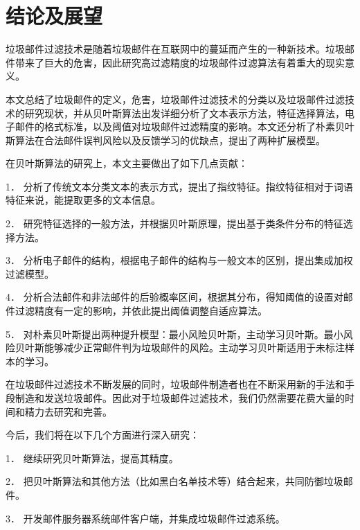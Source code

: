 \chapter{结论及展望}

垃圾邮件过滤技术是随着垃圾邮件在互联网中的蔓延而产生的一种新技术。垃圾邮件带来了巨大的危害，因此研究高过滤精度的垃圾邮件过滤算法有着重大的现实意义。

本文总结了垃圾邮件的定义，危害，垃圾邮件过滤技术的分类以及垃圾邮件过滤技术的研究现状，并从贝叶斯算法出发详细分析了文本表示方法，特征选择算法，电子邮件的格式标准，以及阈值对垃圾邮件过滤精度的影响。本文还分析了朴素贝叶斯算法在合法邮件误判风险以及反馈学习的优缺点，提出了两种扩展模型。

  在贝叶斯算法的研究上，本文主要做出了如下几点贡献：
  
1．	分析了传统文本分类文本的表示方式，提出了指纹特征。指纹特征相对于词语特征来说，能提取更多的文本信息。

2．	研究特征选择的一般方法，并根据贝叶斯原理，提出基于类条件分布的特征选择方法。

3．	分析电子邮件的结构，根据电子邮件的结构与一般文本的区别，提出集成加权过滤模型。

4．	分析合法邮件和非法邮件的后验概率区间，根据其分布，得知阈值的设置对邮件过滤精度有一定的影响，并依此提出阈值调整自适应算法。

5．	对朴素贝叶斯提出两种提升模型：最小风险贝叶斯，主动学习贝叶斯。最小风险贝叶斯能够减少正常邮件判为垃圾邮件的风险。主动学习贝叶斯适用于未标注样本的学习。

  在垃圾邮件过滤技术不断发展的同时，垃圾邮件制造者也在不断采用新的手法和手段制造和发送垃圾邮件。因此对于垃圾邮件过滤技术，我们仍然需要花费大量的时间和精力去研究和完善。
  
 今后，我们将在以下几个方面进行深入研究：
 
1．	 继续研究贝叶斯算法，提高其精度。

2．	把贝叶斯算法和其他方法（比如黑白名单技术等）结合起来，共同防御垃圾邮件。

3．	开发邮件服务器系统邮件客户端，并集成垃圾邮件过滤系统。